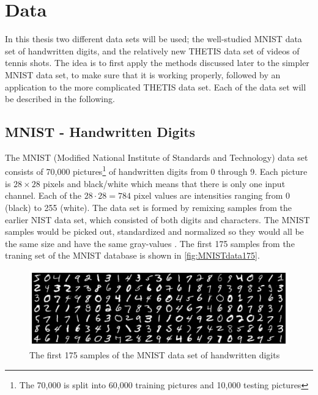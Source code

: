\section{Data} \label{tex:data}

In this thesis two different data sets will be used; the well-studied MNIST data set \cite{MNIST} of handwritten digits, and the relatively new THETIS data set \cite{Gourgari2013} of videos of tennis shots. The idea is to first apply the methods discussed later to the simpler MNIST data set, to make sure that it is working properly, followed by an application to the more complicated THETIS data set. Each of the data set will be described in the following. 

\subsection{MNIST - Handwritten Digits}
The MNIST (Modified National Institute of Standards and Technology) data set \cite{MNIST} consists of 70,000 pictures\footnote{The 70,000 is split into 60,000 training pictures and 10,000 testing pictures} of handwritten digits from 0 through 9. Each picture is $28\times 28$ pixels and black/white which means that there is only one input channel. Each of the $28\cdot 28 = 784$ pixel values are intensities ranging from 0 (black) to 255 (white). The data set is formed by remixing samples from the earlier NIST data set, which consisted of both digits and characters. The MNIST samples would be picked out, standardized and normalized so they would all be the same size and have the same gray-values \cite{mnistdatabase}. The first 175 samples from the traning set of the MNIST database is shown in \autoref{fig:MNISTdata175}. 

\begin{figure}[H]
    \centering
    \includegraphics[width=\linewidth]{Pics/04_Data/MNIST.png}
    \caption{The first 175 samples of the MNIST data set of handwritten digits}
    \label{fig:MNISTdata175}
\end{figure}

